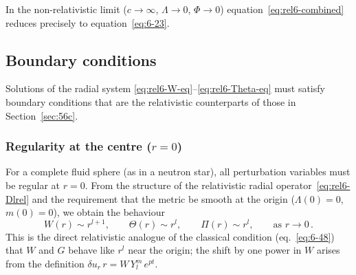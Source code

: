 In the non-relativistic limit
($c \to \infty$, $\Lambda \to 0$, $\Phi \to 0$)
equation~\eqref{eq:rel6-combined} reduces precisely to
equation~\eqref{eq:6-23}.

\subsection{Boundary conditions}
\label{subsec:rel-56-bc}

Solutions of the radial system
\eqref{eq:rel6-W-eq}--\eqref{eq:rel6-Theta-eq} must satisfy boundary
conditions that are the relativistic counterparts of those in
Section~\ref{sec:56c}.

\subsubsection{Regularity at the centre ($r = 0$)}
For a complete fluid sphere (as in a neutron star), all perturbation
variables must be regular at $r = 0$.  From the structure of the
relativistic radial operator~\eqref{eq:rel6-Dlrel} and the requirement
that the metric be smooth at the origin ($\Lambda(0) = 0$,
$m(0) = 0$), we obtain the behaviour
\begin{equation}
  W(r) \sim r^{l+1}, \qquad
  \Theta(r) \sim r^{l}, \qquad
  \Pi(r) \sim r^{l},
  \qquad\text{as } r \to 0 \,.
  \label{eq:rel6-bc-centre}
\end{equation}
This is the direct relativistic analogue of the classical condition
(eq.~\eqref{eq:6-48}) that $W$ and $G$ behave like $r^{l}$ near the
origin; the shift by one power in $W$ arises from the definition
$\delta u_{r}\,r = W\,Y_{l}^{m}\,e^{pt}$.

